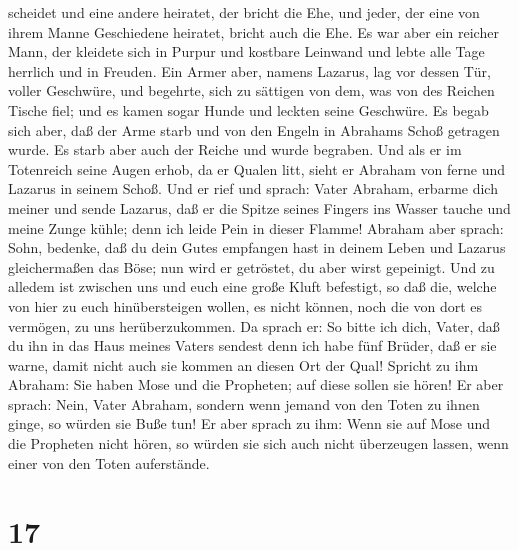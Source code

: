 scheidet und eine andere heiratet, der bricht die Ehe, und jeder, der
eine von ihrem Manne Geschiedene heiratet, bricht auch die Ehe.
 Es war aber ein reicher Mann, der kleidete sich in
Purpur und kostbare Leinwand und lebte alle Tage herrlich und in
Freuden.  Ein Armer aber, namens Lazarus, lag vor dessen
Tür, voller Geschwüre,  und begehrte, sich zu sättigen
von dem, was von des Reichen Tische fiel; und es kamen sogar Hunde und
leckten seine Geschwüre.  Es begab sich aber, daß der
Arme starb und von den Engeln in Abrahams Schoß getragen wurde. Es starb
aber auch der Reiche und wurde begraben.  Und als er im
Totenreich seine Augen erhob, da er Qualen litt, sieht er Abraham von
ferne und Lazarus in seinem Schoß.  Und er rief und
sprach: Vater Abraham, erbarme dich meiner und sende Lazarus, daß er die
Spitze seines Fingers ins Wasser tauche und meine Zunge kühle; denn ich
leide Pein in dieser Flamme!  Abraham aber sprach: Sohn,
bedenke, daß du dein Gutes empfangen hast in deinem Leben und Lazarus
gleichermaßen das Böse; nun wird er getröstet, du aber wirst gepeinigt.
 Und zu alledem ist zwischen uns und euch eine große
Kluft befestigt, so daß die, welche von hier zu euch hinübersteigen
wollen, es nicht können, noch die von dort es vermögen, zu uns
herüberzukommen.  Da sprach er: So bitte ich dich, Vater,
daß du ihn in das Haus meines Vaters sendest  denn ich
habe fünf Brüder, daß er sie warne, damit nicht auch sie kommen an
diesen Ort der Qual!  Spricht zu ihm Abraham: Sie haben
Mose und die Propheten; auf diese sollen sie hören!  Er
aber sprach: Nein, Vater Abraham, sondern wenn jemand von den Toten zu
ihnen ginge, so würden sie Buße tun!  Er aber sprach zu
ihm: Wenn sie auf Mose und die Propheten nicht hören, so würden sie sich
auch nicht überzeugen lassen, wenn einer von den Toten auferstände.

\hypertarget{section-16}{%
\section{17}\label{section-16}}

